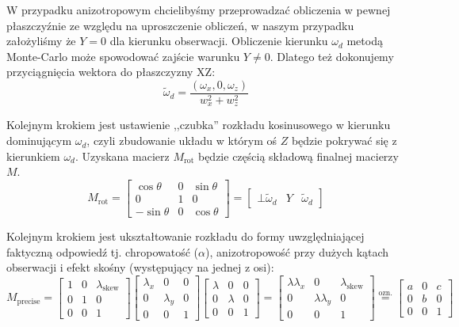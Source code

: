 \documentclass[../main.tex]{subfiles}
\begin{document}
W przypadku anizotropowym chcielibyśmy przeprowadzać obliczenia w pewnej
płaszczyźnie ze względu na uproszczenie obliczeń, w naszym przypadku
założyliśmy że $Y=0$ dla kierunku obserwacji. 
Obliczenie kierunku $\omega_d$ metodą Monte-Carlo może spowodować zajście
warunku $Y \neq 0$. Dlatego też dokonujemy przyciągnięcia wektora do
płaszczyzny XZ:
\[
\widetilde{\omega}_d = \frac{
    \left( \omega_x,0,\omega_z \right)
  }{
    w_x^2+w_z^2
  }
\]

Kolejnym krokiem jest ustawienie ,,czubka'' rozkładu kosinusowego w kierunku
dominującym $\omega_d$, czyli zbudowanie układu w którym oś $Z$ będzie
pokrywać się z kierunkiem $\omega_d$. Uzyskana macierz $M_{\text{rot}}$
będzie częścią składową finalnej macierzy $M$.
\[
M_{\text{rot}} =
\begin{bmatrix}
  \cos\theta  & 0     & \sin\theta \\
  0           & 1     & 0 \\
  -\sin\theta & 0     & \cos\theta
\end{bmatrix}
= \begin{bmatrix}
  \bot {\widetilde{\omega}_d} & Y & \widetilde{\omega}_d
\end{bmatrix}
\]

Kolejnym krokiem jest ukształtowanie rozkładu do formy uwzględniającej
faktyczną odpowiedź tj. chropowatość ($\alpha$), anizotropowość przy
dużych kątach obserwacji i efekt skośny (występujący na jednej z osi):
\[
M_{\text{precise}} =
\begin{bmatrix}
  1 & 0 & \lambda_{\text{skew}} \\
  0 & 1 & 0 \\
  0 & 0 & 1
\end{bmatrix}
\begin{bmatrix}
  \lambda_x & 0 & 0 \\
  0 & \lambda_y & 0 \\
  0 & 0 & 1
\end{bmatrix}
\begin{bmatrix}
  \lambda & 0 & 0 \\
  0 & \lambda & 0 \\
  0 & 0 & 1
\end{bmatrix}
=
\begin{bmatrix}
  \lambda\lambda_x & 0 & \lambda_{\text{skew}} \\
  0 & \lambda\lambda_y & 0 \\
  0 & 0 & 1
\end{bmatrix}
\stackrel{\text{ozn.}}{=}
\begin{bmatrix}
  a & 0 & c \\
  0 & b & 0 \\
  0 & 0 & 1
\end{bmatrix}
\]
\end{document}
